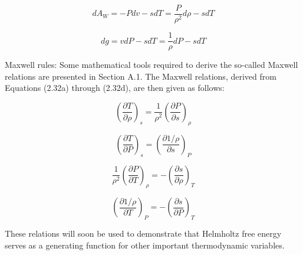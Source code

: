 	\begin{equation}
		dA_W = -Pdv -sdT = \frac{P}{\rho ^2}d\rho - sdT
	\end{equation}

	\begin{equation}
		dg = vdP - sdT = \frac{1}{\rho}dP -sdT
	\end{equation}

	Maxwell rules: Some mathematical tools required to derive the so-called
	Maxwell relations are presented in Section A.1. The Maxwell relations,
	derived from Equations (2.32a) through (2.32d), are then given as follows:

	\begin{equation}
		\left(\frac{\partial T}{\partial \rho}\right)_s = \frac{1}{\rho ^2}\left(\frac{\partial P}{\partial s}\right)_{\rho}
	\end{equation}

	\begin{equation}
		\left(\frac{\partial T}{\partial P}\right)_s = \left(\frac{\partial 1/\rho}{\partial s}\right)_P 
	\end{equation}

	\begin{equation}
		\frac{1}{\rho ^2}\left(\frac{\partial P}{\partial T}\right)_{\rho} = -\left(\frac{\partial s}{\partial \rho}\right)_T
	\end{equation}

	\begin{equation}
		\left(\frac{\partial 1/\rho}{\partial T}\right)_P = -\left(\frac{\partial s}{\partial P}\right)_T
	\end{equation}

	These relations will soon be used to demonstrate that Helmholtz free energy
	serves as a generating function for other important thermodynamic variables.